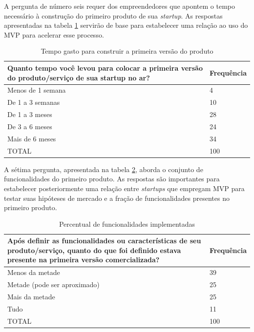 \pagebreak

A pergunta de n\'umero seis requer dos empreendedores que apontem o tempo necess\'ario \`a constru\c{c}\~ao do primeiro produto de sua \emph{startup}. As respostas apresentadas na tabela \ref{tab:pergunta6} servir\~ao de base para estabelecer uma rela\c{c}\~ao ao uso do MVP para acelerar esse processo.

\begin{table}[hb]
\centering
\caption{Tempo gasto para construir a primeira vers\~ao do produto}
\label{tab:pergunta6}
\begin{tabular}{|p{10cm}|p{2cm}|}
\hline{\bf Quanto tempo voc\^e levou para colocar a primeira vers\~ao do produto/servi\c{c}o de sua startup no ar?} & {\bf Frequ\^encia}\\
\hline Menos de 1 semana & 4\\
\hline De 1 a 3 semanas & 10\\
\hline De 1 a 3 meses & 28\\
\hline De 3 a 6 meses & 24\\
\hline Mais de 6 meses & 34\\
\hline TOTAL & 100\\
\hline
\end{tabular}
\end{table}

A s\'etima pergunta, apresentada na tabela \ref{tab:pergunta7}, aborda o conjunto de funcionalidades do primeiro produto. As respostas s\~ao importantes para estabelecer posteriormente uma rela\c{c}\~ao entre \emph{startups} que empregam MVP para testar suas hip\'oteses de mercado e a fra\c{c}\~ao de funcionalidades presentes no primeiro produto.

\begin{table}[hb]
\centering
\caption{Percentual de funcionalidades implementadas}
\label{tab:pergunta7}
\begin{tabular}{|p{10cm}|p{2cm}|}
\hline{\bf Ap\'os definir as funcionalidades ou caracter\'isticas de seu produto/servi\c{c}o, quanto do que foi definido estava presente na primeira vers\~ao comercializada?} & {\bf Frequ\^encia}\\
\hline Menos da metade & 39\\
\hline Metade (pode ser aproximado) & 25\\
\hline Mais da metade & 25\\
\hline Tudo & 11\\
\hline TOTAL & 100\\
\hline
\end{tabular}
\end{table}

